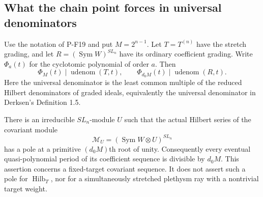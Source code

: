 \subsection{What the chain point forces in universal denominators}

\begin{proposition}
\label{prop:chainuniversaldenominator}
Use the notation of P-F19 and put $M=2^{n-1}$.
Let $T=T^{(n)}$ have the stretch grading, and let
$R=(\operatorname{Sym}W)^{SL_n}$ have its ordinary coefficient grading.
Write $\Phi_a(t)$ for the cyclotomic polynomial of order $a$.
Then
\[
 \Phi_M(t)\mid\operatorname{udenom}(T,t),\qquad
 \Phi_{d_0M}(t)\mid\operatorname{udenom}(R,t).
 \tag{P-F20a}
\]
Here the universal denominator is the least common multiple of the
reduced Hilbert denominators of graded ideals, equivalently the
universal denominator in Derksen's Definition 1.5.

There is an irreducible $SL_n$-module $U$ such that the actual Hilbert
series of the covariant module
\[
 \mathcal M_U=(\operatorname{Sym}W\otimes U)^{SL_n}
 \tag{P-F20b}
\]
has a pole at a primitive $(d_0M)$th root of unity.
Consequently every eventual quasi-polynomial period of its coefficient
sequence is divisible by $d_0M$.
This assertion concerns a fixed-target covariant sequence. It does
not assert such a pole for $\operatorname{Hilb}_T$, nor for a
simultaneously stretched plethysm ray with a nontrivial target weight.
\end{proposition}

